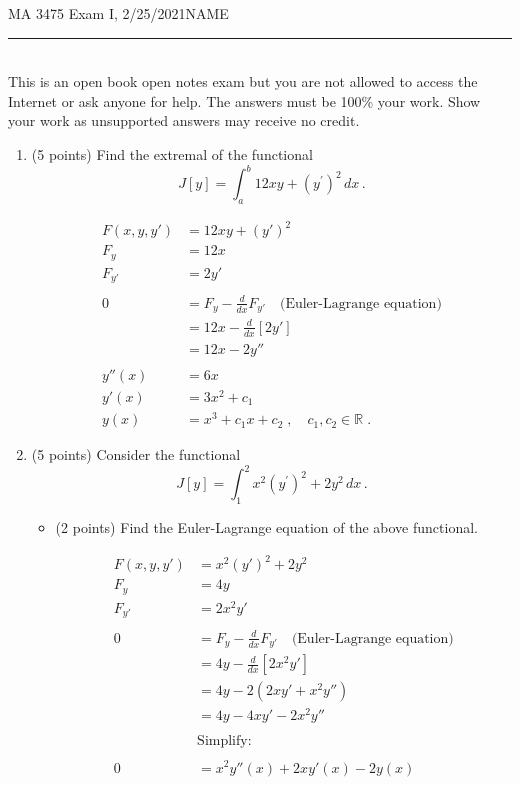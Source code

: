 \documentclass[12pt]{article}
\begin{document}
\noindent MA 3475\,\,Exam I, 2/25/2021\hfill NAME
\rule{6cm}{1pt}\\

This is an open book open notes exam but you are not allowed to access the Internet or ask anyone for help. The answers must be 100\% your work. Show your work as unsupported answers may receive no credit. 

\begin{enumerate}
\item (5 points)\,\,Find the extremal of the functional
$$
J[y] = \int_a^b 12xy + (y^{\prime})^2\,dx\,.
$$

\begin{align*}
F(x,y,y') &= 12xy + (y')^2 \\
F_y &= 12x \\
F_{y'} &= 2y'\\
\\
0 &= F_y - \frac{d}{dx}F_{y'} \quad \text{(Euler-Lagrange equation)} \\
&= 12x - \frac{d}{dx}[2y'] \\
&= 12x - 2y'' \\
\\
y''(x) &= 6x \\
y'(x) &= 3x^2 + c_1 \\
y(x) &= x^3 + c_1x + c_2 \;, \quad c_1,c_2 \in \mathbb{R} \;.
\end{align*}

\newpage
\item (5 points)\,\,Consider the functional
$$
J[y] = \displaystyle\int_1^2 x^2(y^{\prime})^2 + 2y^2\,dx\,.
$$
\begin{itemize}
\item (2 points)\,\,Find the Euler-Lagrange equation of the above functional.

\begin{align*}
F(x,y,y') &= x^2(y')^2 + 2y^2 \\
F_y &= 4y \\
F_{y'} &= 2x^2y'\\
\\
0 &= F_y - \frac{d}{dx}F_{y'} \quad \text{(Euler-Lagrange equation)} \\
&= 4y - \frac{d}{dx}[2x^2y'] \\
&= 4y - 2(2xy' + x^2y'') \\
&= 4y - 4xy' - 2x^2y''\\
\\
&\text{Simplify:}\\
\\
0&= x^2y''(x) +2xy'(x) -2y(x)
\end{align*}


\end{itemize}
\end{enumerate}
\end{document}
